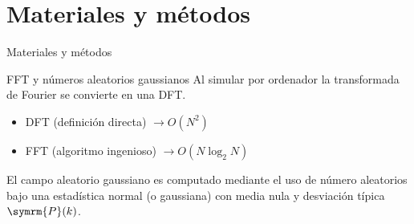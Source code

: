 \section{Materiales y métodos}
\begin{frame}[noframenumbering]{Materiales y métodos}
    \begin{block}{FFT y números aleatorios gaussianos}
        Al simular por ordenador la transformada de Fourier se convierte en una DFT.
        \begin{center}
            \begin{minipage}{.5\linewidth}
                \begin{itemize}
                    \item[\textcolor{ngmark}{\ngmark}] DFT (definición directa) \(\longrightarrow O(N^2)\)
                    \item[\textcolor{okmark}{\okmark}] FFT (algoritmo ingenioso) \(\longrightarrow O(N\log_2N)\)
                \end{itemize}
            \end{minipage}
        \end{center}
        \pause
        \vspace{.3cm}
        El campo aleatorio gaussiano es computado mediante el uso de número aleatorios bajo una estadística normal (o gaussiana) con media nula y desviación típica \(\symrm{P}(k)\).
    \end{block}
\end{frame}
